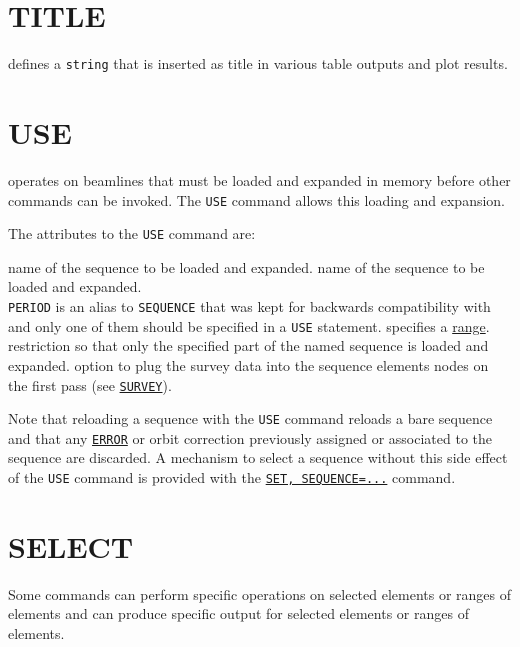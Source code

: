 \section{TITLE}
\label{sec:title}
defines a \texttt{string} that is inserted as title in various table
outputs and plot results.  


\section{USE}
\label{sec:use}
\madx operates on beamlines that must be loaded and expanded in memory
before other commands can be invoked. The \texttt{USE} command allows
this loading and expansion.


The attributes to the \texttt{USE} command are:
\begin{madlist}
   name of the sequence to be loaded and expanded. 
   name of the sequence to be loaded and expanded. \\ 
  \texttt{PERIOD} is an alias to \texttt{SEQUENCE} that was kept for
  backwards compatibility with \madeight and only one of them should be
  specified in a \texttt{USE} statement. 
   specifies a \hyperref[sec:range]{range}.   
  restriction so that only the specified part of the named sequence is
  loaded and  expanded.
   option to plug the survey data into the sequence elements
  nodes on the first pass (see \hyperref[chap:survey]{\texttt{SURVEY}}).
\end{madlist}

Note that reloading a sequence with the \texttt{USE} command reloads a
bare sequence and that any \hyperref[chap:error]{\texttt{ERROR}} or
orbit correction previously assigned or associated to the sequence are
discarded. A mechanism to select a sequence without this side effect of the 
\texttt{USE} command is provided with the
\hyperref[sec:set]{\texttt{SET, SEQUENCE=...}} command. 


\section{SELECT} 
\label{sec:select}

Some \madx commands can perform specific operations on selected elements
or ranges of elements and can produce specific output for selected
elements or ranges of elements. 

